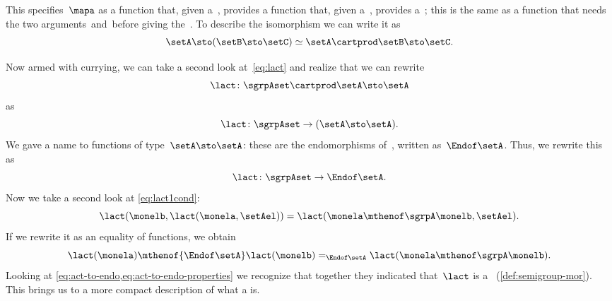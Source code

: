 This specifies~$\mapa$ as a function that, given a~\setA, provides a function that, given a~\setB, provides a~\setC;
this is the same as a function that needs the two arguments~\setA and~\setB before giving the~\setC.
To describe the isomorphism we can write it as
\begin{equation}
    \label{eq:currying-iso-1}
    \setA \sto ( \setB \sto \setC) \simeq  \setA \cartprod \setB \sto \setC.
\end{equation}


Now armed with currying, we can take a second look at~\cref{eq:lact} and realize that we can rewrite
\begin{equation}
    \label{eq:currying-lact-1}
    \lact \colon \sgrpAset \cartprod \setA \sto \setA
\end{equation}
as
\begin{equation}
    \label{eq:currying-lact-2}
    \lact \colon \sgrpAset \to (\setA \sto \setA).
\end{equation}
%
We gave a name to functions of type~$\setA \sto \setA$: these are the endomorphisms of~\setA, written as~$\Endof\setA$.
Thus, we rewrite this as
%
\begin{equation}
    \label{eq:act-to-endo}
    \lact \colon \sgrpAset \to \Endof\setA.
\end{equation}
%
Now we take a second look at \cref{eq:lact1cond}:
%
\begin{equation}
    \label{eq:lact1cond-2}
    \lact(\monelb, \lact(\monela, \setAel)) = \lact(\monela \mthenof\sgrpA \monelb, \setAel).
\end{equation}
%
If we rewrite it as an equality of functions, we obtain
%
\begin{equation}
    \label{eq:act-to-endo-properties}
    \lact(\monela) \mthenof{\Endof\setA}  \lact(\monelb) =_{\Endof\setA} \lact(\monela \mthenof\sgrpA \monelb).
\end{equation}
%
Looking at \cref{eq:act-to-endo,eq:act-to-endo-properties} we recognize that together they indicated that~$\lact$ is a ~(\cref{def:semigroup-mor}).
This brings us to a more compact description of what a  is.

